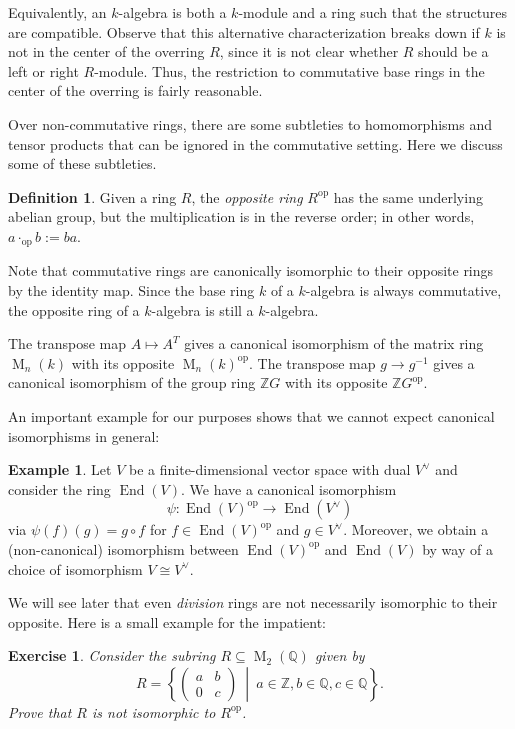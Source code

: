 \documentclass[12pt]{article}
\theoremstyle{plain}
\newtheorem{exercise}[theorem]{Exercise}
\theoremstyle{definition}
\newtheorem{definition}[theorem]{Definition}
\newtheorem{example}[theorem]{Example}
\theoremstyle{remark}
\numberwithin{equation}{section}
\begin{document}
Equivalently, an $k$-algebra is both a $k$-module and a ring such
that the structures are compatible.
Observe that this alternative characterization breaks down if $k$ is not
in the center of the overring $R$, since it is not clear whether
$R$ should be a left or right $R$-module.
Thus, the restriction to commutative base rings in the center of the
overring is fairly reasonable.

Over non-commutative rings, there are some subtleties to homomorphisms
and tensor products that can be ignored in the commutative setting.
Here we discuss some of these subtleties.

\begin{definition}
Given a ring $R$, the \emph{opposite ring} $R^{\mathrm{op}}$ has
the same underlying abelian group, but the multiplication is in the
reverse order; in other words, $a \cdot_{\mathrm{op}} b := ba$.
\end{definition}

Note that commutative rings are canonically isomorphic to their
opposite rings by the identity map.
Since the base ring $k$ of a $k$-algebra is always commutative,
the opposite ring of a $k$-algebra is still a $k$-algebra.

The transpose map $A \mapsto A^T$ gives a canonical isomorphism
of the matrix ring $\operatorname{M}_n(k)$ with its opposite
$\operatorname{M}_n(k)^{\mathrm{op}}$.
The transpose map $g \to g^{-1}$ gives a canonical isomorphism
of the group ring $\mathbb{Z}G$ with its opposite
$\mathbb{Z}G^{\mathrm{op}}$.

An important example for our purposes shows that we cannot expect
canonical isomorphisms in general:

\begin{example}
Let $V$ be a finite-dimensional vector space with dual $V^\vee$
and consider the ring $\operatorname{End}(V)$.
We have a canonical isomorphism
\[
\psi : \operatorname{End}(V)^{\mathrm{op}} \to \operatorname{End}(V^\vee)
\]
via $\psi(f)(g)=g \circ f$ for $f \in
\operatorname{End}(V)^{\mathrm{op}}$ and $g \in V^\vee$.
Moreover, we obtain a (non-canonical) isomorphism between
$\operatorname{End}(V)^{\mathrm{op}}$ and $\operatorname{End}(V)$
by way of a choice of isomorphism $V \cong V^\vee$.
\end{example}

We will see later that even \emph{division} rings are not necessarily
isomorphic to their opposite.  Here is a small example for the
impatient: 

\begin{exercise}
Consider the subring $R \subseteq \operatorname{M}_2(\mathbb{Q})$
given by
\[
R = \left\{ \begin{pmatrix} a & b\\ 0 & c \end{pmatrix}\ \middle|\
a \in \mathbb{Z}, b \in \mathbb{Q}, c \in \mathbb{Q} \right\}.
\]
Prove that $R$ is not isomorphic to $R^{\mathrm{op}}$.
\end{exercise}
\end{document}
